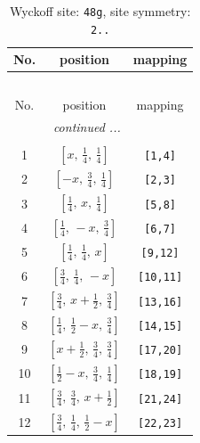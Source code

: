 \documentclass[fleqn,8pt]{jsarticle}
\begin{document}
\begin{longtable}{ccc}
\caption{Wyckoff site: {\tt 48g}, site symmetry: {\tt 2..}}
 \\
 \hline \hline
No. & position & mapping \\ \hline \endfirsthead

\multicolumn{2}{l}{\tablename\ \thetable{}} \\
 \hline \hline
No. & position & mapping \\ \hline \endhead

 \hline \hline
\multicolumn{2}{r}{\footnotesize\it continued ...} \\ \endfoot

 \hline \hline
\multicolumn{2}{r}{} \\ \endlastfoot

1 & $\left[ x,\, \frac{1}{4},\, \frac{1}{4} \right]$ & {\tt [1,4]} \\ \hline
2 & $\left[ - x,\, \frac{3}{4},\, \frac{1}{4} \right]$ & {\tt [2,3]} \\ \hline
3 & $\left[ \frac{1}{4},\, x,\, \frac{1}{4} \right]$ & {\tt [5,8]} \\ \hline
4 & $\left[ \frac{1}{4},\, - x,\, \frac{3}{4} \right]$ & {\tt [6,7]} \\ \hline
5 & $\left[ \frac{1}{4},\, \frac{1}{4},\, x \right]$ & {\tt [9,12]} \\ \hline
6 & $\left[ \frac{3}{4},\, \frac{1}{4},\, - x \right]$ & {\tt [10,11]} \\ \hline
7 & $\left[ \frac{3}{4},\, x + \frac{1}{2},\, \frac{3}{4} \right]$ & {\tt [13,16]} \\ \hline
8 & $\left[ \frac{1}{4},\, \frac{1}{2} - x,\, \frac{3}{4} \right]$ & {\tt [14,15]} \\ \hline
9 & $\left[ x + \frac{1}{2},\, \frac{3}{4},\, \frac{3}{4} \right]$ & {\tt [17,20]} \\ \hline
10 & $\left[ \frac{1}{2} - x,\, \frac{3}{4},\, \frac{1}{4} \right]$ & {\tt [18,19]} \\ \hline
11 & $\left[ \frac{3}{4},\, \frac{3}{4},\, x + \frac{1}{2} \right]$ & {\tt [21,24]} \\ \hline
12 & $\left[ \frac{3}{4},\, \frac{1}{4},\, \frac{1}{2} - x \right]$ & {\tt [22,23]} \\
\end{longtable}
\renewcommand{\arraystretch}{1.2}
\end{document}
